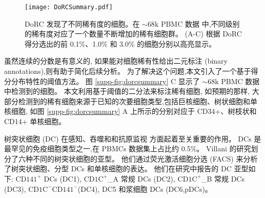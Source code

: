 \begin{figure*}[!htbp]
    \centering
    \texttt{[image: DoRCSummary.pdf]}
    \caption{
    DoRC 发现了不同稀有度的细胞。在 ${\sim}68$k PBMC 数据  中,不同级别的稀有度对应了一个数量不断增加的稀有细胞群。
    (A-C) 根据 DoRC 得分选出的前 0.1\%、1.0\% 和 3.0\% 的细胞分别以高亮显示。    
    }
    \label{fig:dorcsummary}
\end{figure*}

虽然连续的分数是有意义的,
如果能对细胞稀有性给出二元标注 (binary annotations),则有助于简化后续分析。
为了解决这个问题,本文引入了一个基于得分分布特性的阈值方法。
图 \ref{supp-fig:dorcsummary} C 显示了 ${\sim}68$k PBMC 数据中检测到的细胞。
本文利用基于阈值的二分法来标注稀有细胞,
如预期的那样,
大部分检测到的稀有细胞来源于已知的次要细胞类型,包括巨核细胞、树状细胞和单核细胞,
如图 \ref{supp-fig:dorcsummary} A 上所示的分别对应于 CD34+、树枝状和 CD14+ 单核细胞。


树突状细胞 (DC) 在感知、吞噬和和抗原监视  方面起着至关重要的作用。
DCs 是最罕见的免疫细胞类型之一,在 PBMCs  数据集上占比约 0.5\%。
Villani  的研究划分了六种不同的树突状细胞的亚型。
他们通过荧光激活细胞分选 (FACS) 来分析了树突状细胞、分型 DCs 和单核细胞的表达。
他们在研究中报告的 DC 亚型如下:
$\text{CD141}^+$ DCs (DC1), 
$\text{CD1C}^+${\_}A 常规 DCs (DC2),
$\text{CD1C}^+${\_}B 常规 DCs (DC3),
$\text{CD1C}^-\text{CD141}^-$(DC4), DC5 和浆细胞 DCs (DC6,pDCs)。


